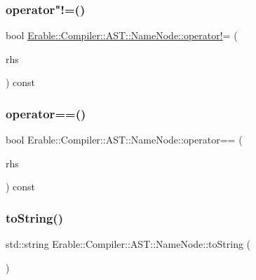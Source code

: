 \subsubsection{\texorpdfstring{operator"!=()}{operator!=()}}
{\footnotesize\ttfamily bool \mbox{\hyperlink{_old___symbols_8cpp_a97d4f78b45720ac94460bcecd041ac57}{Erable\+::\+Compiler\+::\+A\+S\+T\+::\+Name\+Node\+::operator!}}= (\begin{DoxyParamCaption}\item[{const \mbox{\hyperlink{struct_erable_1_1_compiler_1_1_a_s_t_1_1_name_node}{Name\+Node}} \&}]{rhs }\end{DoxyParamCaption}) const}

\mbox{\label{struct_erable_1_1_compiler_1_1_a_s_t_1_1_name_node_a31f385a6b5c3b57e3bdaf4e15dbd4c09}} 
\subsubsection{\texorpdfstring{operator==()}{operator==()}}
{\footnotesize\ttfamily bool Erable\+::\+Compiler\+::\+A\+S\+T\+::\+Name\+Node\+::operator== (\begin{DoxyParamCaption}\item[{const \mbox{\hyperlink{struct_erable_1_1_compiler_1_1_a_s_t_1_1_name_node}{Name\+Node}} \&}]{rhs }\end{DoxyParamCaption}) const}

\mbox{\label{struct_erable_1_1_compiler_1_1_a_s_t_1_1_name_node_acc5b111aaee85751704e583fb9c57e92}} 
\subsubsection{\texorpdfstring{toString()}{toString()}}
{\footnotesize\ttfamily std\+::string Erable\+::\+Compiler\+::\+A\+S\+T\+::\+Name\+Node\+::to\+String (\begin{DoxyParamCaption}{ }\end{DoxyParamCaption})}



